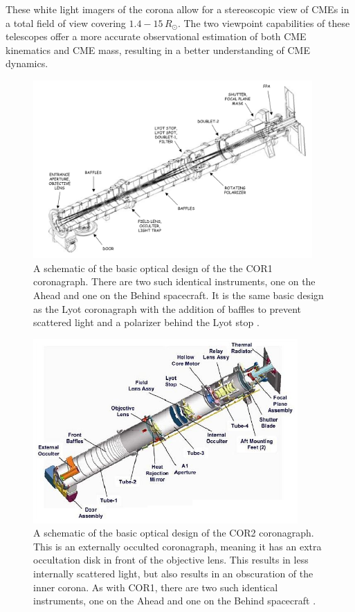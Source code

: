 These white light imagers of the corona allow for a stereoscopic view of CMEs in a total field of view covering $1.4 - 15\,R_{\odot}$. The two viewpoint capabilities of these telescopes offer a more accurate observational estimation of both CME kinematics and CME mass, resulting in a better understanding of CME dynamics.
\begin{figure}[!t]
\begin{center}
\includegraphics[width=0.95\textwidth]{images/COR1_design}
\caption[The COR1 coronagraph]{A schematic of the basic optical design of the the COR1 coronagraph. There are two such identical instruments, one on the Ahead and one on the Behind spacecraft. It is the same basic design as the Lyot coronagraph with the addition of baffles to prevent scattered light and a polarizer behind the Lyot stop \citep{thomp2008}.}
\label{fig:COR1_design}
\end{center}
\end{figure}
\begin{figure}[!t]
\begin{center}
\includegraphics[width=0.9\textwidth]{images/cor2}
\caption[The COR2 coronagraph]{A schematic of the basic optical design of the COR2 coronagraph. This is an externally occulted coronagraph, meaning it has an extra occultation disk in front of the objective lens. This results in less internally scattered light, but also results in an obscuration of the inner corona. As with COR1, there are two such identical instruments, one on the Ahead and one on the Behind spacecraft \citep{how08}.}
\label{fig:cor2}
\end{center}
\end{figure}

